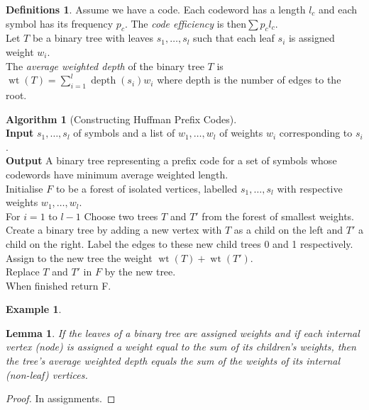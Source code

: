 \documentclass{article}
\newtheorem*{lem}{Lemma}
\theoremstyle{definition}
\newtheorem*{defns}{Definitions}
\newtheorem*{ex}{Example}
\newtheorem*{alg}{Algorithm}
\DeclareMathOperator{\wt}{wt}
\DeclareMathOperator{\depth}{depth}
\begin{document}

\begin{defns}
Assume we have a code.
Each codeword has a length $l_c$ and each symbol has its frequency $p_c$.
The \emph{code efficiency} is then$\sum p_cl_c$. \\
Let $T$ be a binary tree with leaves $s_1,\ldots,s_l$ such that each leaf $s_i$ is assigned weight $w_i$.\\
The \emph{average weighted depth} of the binary tree $T$ is $\wt(T) = \sum_{i=1}^l\depth(s_i)w_i$ where depth is the number of edges to the root.
\end{defns}

\begin{alg}[Constructing Huffman Prefix Codes]~\\
\textbf{Input} $s_1,\ldots,s_l$ of symbols and a list of $w_1,\ldots,w_l$ of weights $w_i$ corresponding to $s_i$.\\
\textbf{Output} A binary tree representing a prefix code for a set of symbols whose codewords have minimum average weighted length.\\
Initialise $F$ to be a forest of isolated vertices, labelled $s_1,\ldots,s_l$ with respective weights $w_1,\ldots, w_l$. \\
For $i=1$ to $l-1$ Choose two trees $T$ and $T'$ from the forest of smallest weights.\\
Create a binary tree by adding a new vertex with $T$ as a child on the left and $T'$ a child on the right. Label the edges to these new child trees 0 and 1 respectively. \\
Assign to the new tree the weight $\wt(T)+\wt(T')$. \\
Replace $T$ and $T'$ in $F$ by the new tree. \\
When finished return F.
\end{alg}

\begin{ex}
\end{ex}

\begin{lem}
If the leaves of a binary tree are assigned weights and if each internal vertex (node) is assigned a weight equal to the sum of its children's weights, then the tree's average weighted depth equals the sum of the weights of its internal (non-leaf) vertices.
\end{lem}

\begin{proof}
In assignments.
\end{proof}
\end{document}
